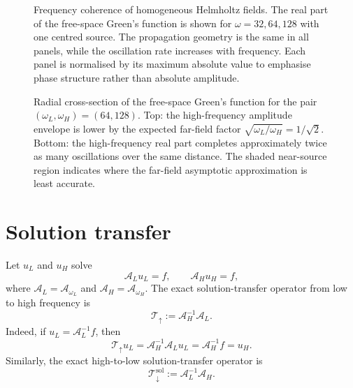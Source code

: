 \begin{figure}[htbp]
    \centering
    \caption{Frequency coherence of homogeneous Helmholtz fields. The real
    part of the free-space Green's function is shown for
    $\omega=32,64,128$ with one centred source. The propagation geometry is the
    same in all panels, while the oscillation rate increases with frequency.
    Each panel is normalised by its maximum absolute value to emphasise phase
    structure rather than absolute amplitude.}
    \label{fig:ch5-green-frequency-coherence}
\end{figure}

\begin{figure}[htbp]
    \centering
    \caption{Radial cross-section of the free-space Green's function for the
    pair $(\omega_L,\omega_H)=(64,128)$. Top: the high-frequency amplitude
    envelope is lower by the expected far-field factor
    $\sqrt{\omega_L/\omega_H}=1/\sqrt{2}$. Bottom: the high-frequency real
    part completes approximately twice as many oscillations over the same
    distance. The shaded near-source region indicates where the far-field
    asymptotic approximation is least accurate.}
    \label{fig:ch5-radial-green-cross-section}
\end{figure}

\section{Solution transfer}
\label{sec:ch5-solution-transfer}

Let $u_L$ and $u_H$ solve
\begin{equation}
    \mathcal{A}_L u_L = f,
    \qquad
    \mathcal{A}_H u_H = f,
    \label{eq:ch5-two-frequency-solves}
\end{equation}
where $\mathcal{A}_L=\mathcal{A}_{\omega_L}$ and
$\mathcal{A}_H=\mathcal{A}_{\omega_H}$. The exact solution-transfer operator
from low to high frequency is
\begin{equation}
    \mathcal{T}_{\uparrow}
    :=
    \mathcal{A}_H^{-1}\mathcal{A}_L.
    \label{eq:ch5-exact-solution-transfer-up}
\end{equation}
Indeed, if $u_L=\mathcal{A}_L^{-1}f$, then
\begin{equation}
    \mathcal{T}_{\uparrow}u_L
    =
    \mathcal{A}_H^{-1}\mathcal{A}_L u_L
    =
    \mathcal{A}_H^{-1}f
    =
    u_H.
    \label{eq:ch5-transfer-maps-solutions}
\end{equation}
Similarly, the exact high-to-low solution-transfer operator is
\begin{equation}
    \mathcal{T}_{\downarrow}^{\mathrm{sol}}
    :=
    \mathcal{A}_L^{-1}\mathcal{A}_H.
    \label{eq:ch5-exact-solution-transfer-down}
\end{equation}

